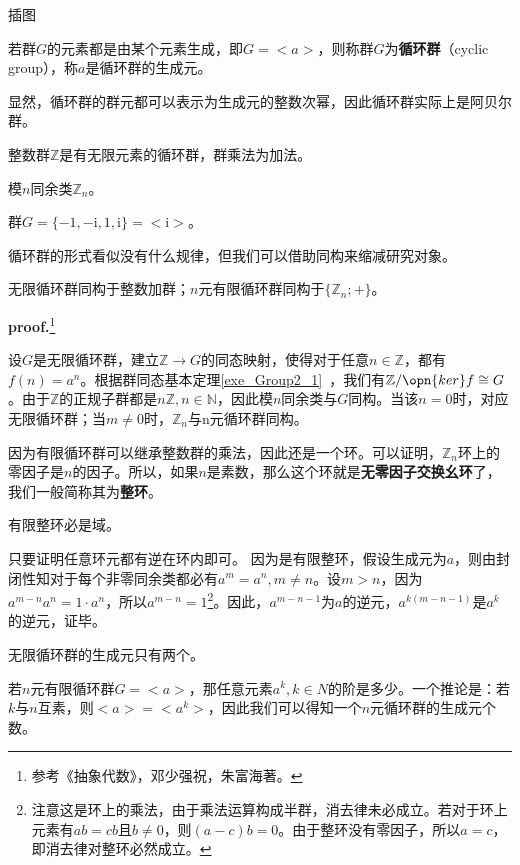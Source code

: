 

\begin{issues}
\issueTODO 插图
\end{issues}

\begin{definition}{}
若群$G$的元素都是由某个元素生成，即$G=<a>$，则称群$G$为\textbf{循环群}（cyclic group），称$a$是循环群的生成元。
\end{definition}

显然，循环群的群元都可以表示为生成元的整数次幂，因此循环群实际上是阿贝尔群。
\begin{example}{}
整数群$\mathbb Z$是有无限元素的循环群，群乘法为加法。
\end{example}
\begin{example}{}
模$n$同余类$\mathbb Z_n$。
\end{example}
\begin{example}{}
群$G=\{-1,-\mathrm i,1,\mathrm i\}=<\mathrm i>$。
\end{example}
循环群的形式看似没有什么规律，但我们可以借助同构来缩减研究对象。
\begin{theorem}{}
无限循环群同构于整数加群；$n$元有限循环群同构于$\{\mathbb Z_n;+\}$。
\end{theorem}
\textbf{proof.}\footnote{参考《抽象代数》，邓少强祝，朱富海著。}

设$G$是无限循环群，建立$\mathbb Z\rightarrow G$的同态映射，使得对于任意$n\in \mathbb Z$，都有$f(n)=a^n$。根据群同态基本定理\autoref{exe_Group2_1}~，我们有$\mathbb Z/\opn{ker}f\cong G$。由于$\mathbb Z$的正规子群都是$n\mathbb Z,n\in \mathbb N$，因此模$n$同余类与$G$同构。当该$n=0$时，对应无限循环群；当$m\neq 0$时，$\mathbb Z_n$与n元循环群同构。

因为有限循环群可以继承整数群的乘法，因此还是一个环。可以证明，$\mathbb Z_n$环上的零因子是$n$的因子。所以，如果$n$是素数，那么这个环就是\textbf{无零因子交换幺环}了，我们一般简称其为\textbf{整环}。
\begin{theorem}{}
有限整环必是域。
\end{theorem}
只要证明任意环元都有逆在环内即可。
因为是有限整环，假设生成元为$a$，则由封闭性知对于每个非零同余类都必有$a^m=a^n,m\neq n$。设$m> n$，因为$a^{m-n}a^n=1\cdot a^n$，所以$a^{m-n}=1$\footnote{注意这是环上的乘法，由于乘法运算构成半群，消去律未必成立。若对于环上元素有$ab=cb$且$b\neq 0$，则$(a-c)b=0$。由于整环没有零因子，所以$a=c$，即消去律对整环必然成立。}。因此，$a^{m-n-1}$为$a$的逆元，$a^{k(m-n-1)}$是$a^k$的逆元，证毕。
\begin{exercise}{}
无限循环群的生成元只有两个。
\end{exercise}
\begin{exercise}{}
若$n$元有限循环群$G=<a>$，那任意元素$a^k,k\in N$的阶是多少。一个推论是：若$k$与$n$互素，则$<a>=<a^k>$，因此我们可以得知一个$n$元循环群的生成元个数。
\end{exercise}
